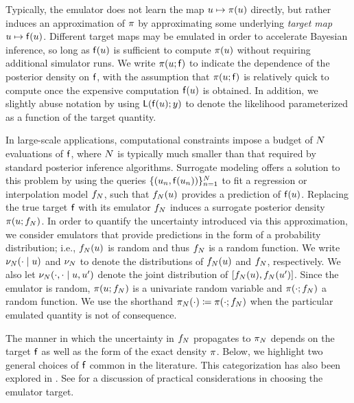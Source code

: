 \documentclass[12pt]{article}
\begin{document}
Typically, the emulator does not learn the map
$u \mapsto \pi(u)$ directly, but rather induces an approximation
of $\pi$ by approximating some underlying \textit{target map}
$u \mapsto \mathsf{f}(u)$. Different target maps may be emulated in order to
 accelerate Bayesian inference, so long as $\mathsf{f}(u)$ is sufficient to compute 
 $\pi(u)$ without requiring additional simulator runs. We write 
 $\pi(u; \mathsf{f})$ to indicate the dependence of the posterior density 
 on $\mathsf{f}$, with the assumption that $\pi(u; \mathsf{f})$ is relatively 
 quick to compute once the expensive computation $\mathsf{f}(u)$ is
 obtained. In addition, we slightly abuse notation by using $\mathsf{L}(\mathsf{f}(u); y)$ 
 to denote the likelihood parameterized as a function of the target quantity. 
 
In large-scale applications, computational constraints impose a budget of 
$N$ evaluations of $\mathsf{f}$, where 
$N$ is typically much smaller than that required by standard posterior
inference algorithms. Surrogate modeling offers a solution to this problem 
by using the queries $\{(u_n, \mathsf{f}(u_n))\}_{n=1}^{N}$ to 
fit a regression or interpolation model $f_{N}$, such that $f_{N}(u)$
provides a prediction of $\mathsf{f}(u)$.
Replacing the true target $\mathsf{f}$ with its emulator $f_{N}$ induces a 
surrogate posterior density $\pi(u; f_{N})$. In order to quantify
the uncertainty introduced via this approximation, we consider emulators 
that provide predictions in the form of a probability distribution; 
i.e., $f_{N}(u)$ is random and thus $f_{N}$ is a random function. 
We write $\nu_{N}(\cdot \mid u)$ and $\nu_{N}$ to denote the distributions
of $f_{N}(u)$ and $f_{N}$, respectively. We also let 
$\nu_{N}(\cdot, \cdot \mid u, u^\prime)$ denote the joint distribution of 
$[f_{N}(u), f_{N}(u^\prime)]$.
Since the emulator is random, 
$\pi(u; f_{N})$ is a univariate random variable and 
$\pi(\cdot; f_{N})$ a random 
function. We use the shorthand $\pi_{N}(\cdot) \coloneqq \pi(\cdot; f_{N})$ 
when the particular emulated quantity is not of consequence. 

The manner in which the uncertainty in $f_{N}$ propagates to $\pi_{N}$
depends on the target $\mathsf{f}$ as well as the form of the exact density 
$\pi$. Below, we highlight two general choices of $\mathsf{f}$ common 
in the literature. This categorization has also 
been explored in \citet{StuartTeck1,StuartTeck2,GP_PDE_priors}. See
\citet{reviewPaper} for a discussion of practical considerations in choosing 
the emulator target. 
\end{document}
